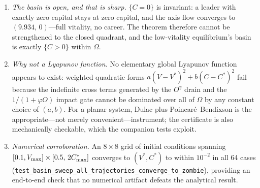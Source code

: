 \begin{enumerate}
\item \emph{The basin is open, and that is sharp.} $\{C=0\}$ is invariant:
a leader with exactly zero capital stays at zero capital, and the axis
flow converges to $(9.934,\,0)$---full vitality, no career. The theorem
therefore cannot be strengthened to the closed quadrant, and the
low-vitality equilibrium's basin is exactly $\{C>0\}$ within $\Omega$.
\item \emph{Why not a Lyapunov function.} No elementary global Lyapunov
function appears to exist: weighted quadratic forms
$a(V-V^{*})^{2}+b(C-C^{*})^{2}$ fail because the indefinite cross terms
generated by the $O^{\gamma}$ drain and the $1/(1+\varphi O)$ impact gate
cannot be dominated over all of $\Omega$ by any constant choice of
$(a,b)$. For a planar system, Dulac plus Poincar\'e--Bendixson is the
appropriate---not merely convenient---instrument; the certificate is also
mechanically checkable, which the companion tests exploit.
\item \emph{Numerical corroboration.} An $8\times8$ grid of initial
conditions spanning $[0.1,V_{\max}]\times[0.5,\,2C^{*}_{\max}]$ converges to
$(V^{*},C^{*})$ to within $10^{-2}$ in all 64 cases
(\texttt{test\_basin\_sweep\_all\_trajectories\_converge\_to\_zombie}),
providing an end-to-end check that no numerical artifact defeats the
analytical result.
\end{enumerate}
